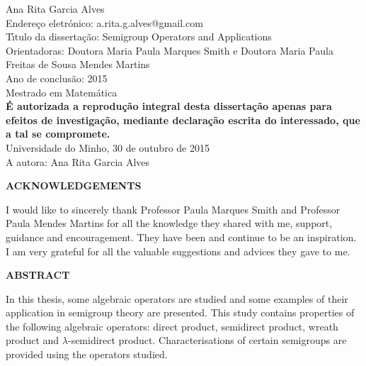 \documentclass[12pt,a4paper,twoside]{report}
\theoremstyle{remark}
\theoremstyle{example}
\begin{document}


\newpage
\thispagestyle{empty}
\null
\newpage

\hbox{}

\strut

\noindent Ana Rita Garcia Alves\\

\noindent Endere\c{c}o eletr\'{o}nico:   a.rita.g.alves@gmail.com \\

\vspace{1cm}\noindent T\'{\i}tulo da disserta\c{c}\~{a}o: Semigroup Operators and Applications\\

\noindent Orientadoras: Doutora Maria Paula Marques Smith e Doutora Maria Paula Freitas de Sousa Mendes Martins\\

\noindent Ano de conclus\~{a}o: 2015\\

\noindent Mestrado em Matem\'{a}tica\\

\vspace{4cm}
\noindent \textbf{\'{E} autorizada a reprodu\c{c}\~{a}o integral desta disserta\c{c}\~{a}o apenas para efeitos de investiga\c{c}\~{a}o, mediante declara\c{c}\~{a}o escrita do interessado, que a tal se compromete.}\\

\noindent Universidade do Minho, 30 de outubro de 2015\\

\noindent A autora: Ana Rita Garcia Alves

\newpage\noindent\textbf{ACKNOWLEDGEMENTS}

\strut

I would like to sincerely thank Professor Paula Marques Smith and Professor Paula Mendes Martins for all the knowledge they shared with me, support, guidance and encouragement. They have been and continue to be an inspiration. I am very grateful for all the valuable suggestions and advices they gave to me.

\newpage
\thispagestyle{empty}
\null

\newpage\noindent\textbf{ABSTRACT}

\strut

In this thesis, some algebraic operators are studied and some examples of their application in semigroup theory are presented. This study contains properties of the following algebraic operators: direct product, semidirect product, wreath product and $\lambda$-semidirect product. Characterisations of certain semigroups are provided using the operators studied.
\end{document}
